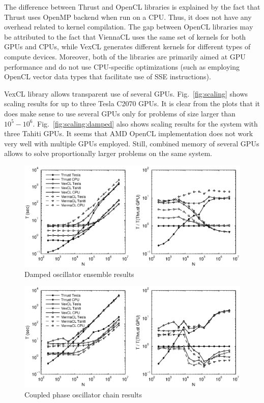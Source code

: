 \documentclass[1p]{elsarticle}
\newcommand{\figref}[1]{Fig.~\ref{#1}}
\begin{document}
The difference between Thrust and OpenCL libraries is explained by the fact
that Thrust uses OpenMP backend when run on a CPU. Thus, it does not have any
overhead related to kernel compilation.  The gap between OpenCL libraries may
be attributed to the fact that ViennaCL uses the same set of kernels for both
GPUs and CPUs, while VexCL generates different kernels for different types of
compute devices. Moreover, both of the libraries are primarily aimed at GPU
performance and do not use CPU-specific optimizations (such as employing OpenCL
vector data types that facilitate use of SSE instructions).

VexCL library allows transparent use of several GPUs. \figref{fig:scaling}
shows scaling results for up to three Tesla C2070 GPUs. It is clear from the
plots that it does make sense to use several GPUs only for problems of size
larger than $10^5-10^6$. \figref{fig:scaling:damped} also shows
scaling results for the system with three Tahiti GPUs. It seems that AMD OpenCL
implementation does not work very well with multiple GPUs employed. Still,
combined memory of several GPUs allows to solve proportionally larger problems
on the same system.

\begin{figure}[p]
    \begin{center}
        \includegraphics[width=\textwidth]{data/damped_oscillator/perfcmp}
    \end{center}
    \caption{Damped oscillator ensemble results}
    \label{fig:damped:perf}
\end{figure}

\begin{figure}[p]
    \begin{center}
        \includegraphics[width=\textwidth]{data/phase_oscillator_chain/perfcmp}
    \end{center}
    \caption{Coupled phase oscillator chain results}
    \label{fig:phase:perf}
\end{figure}
\end{document}
